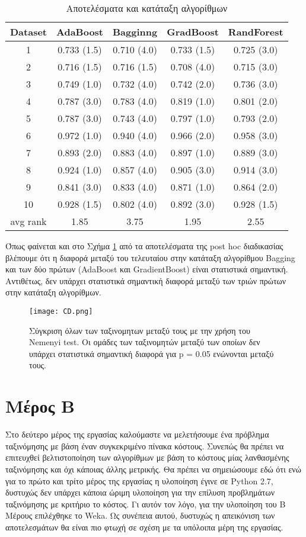 \begin{table*}
	\centering
	\caption{Αποτελέσματα και κατάταξη αλγορίθμων}
	\label{tab:ranking}
	\begin{tabular}{ccccc}
		\hline
		\ttfamily Dataset & \ttfamily AdaBoost & \ttfamily Bagginng & \ttfamily GradBoost & \ttfamily RandForest
		\\	\hline
		1&	0.733 (1.5)&    0.710 (4.0) &	0.733 (1.5)&	0.725 (3.0) \\ \hline
		2&	0.716 (1.5)&    0.716 (1.5) &	0.708 (4.0)&	0.715 (3.0)\\ \hline
		3&	0.749 (1.0)&	0.732 (4.0)&	0.742 (2.0)&	0.736 (3.0) \\ \hline
		4&	0.787 (3.0)&	0.783 (4.0)&	0.819 (1.0)&	0.801 (2.0)\\ \hline
		5&	0.787 (3.0)&	0.743 (4.0)&	0.797 (1.0)&	0.793 (2.0)\\ \hline
		6&	0.972 (1.0)&	0.940 (4.0)&	0.966 (2.0)&	0.958 (3.0)\\ \hline
		7&	0.893 (2.0)&	0.883 (4.0)&	0.897 (1.0)&	0.889 (3.0)\\ \hline
		8&	0.924 (1.0)&	0.857 (4.0)&	0.905 (3.0)&	0.914 (3.0)\\ \hline
		9&	0.841 (3.0)&	0.833 (4.0)&	0.871 (1.0)&	0.864 (2.0)\\ \hline
		10&	0.928 (1.5)&	0.802 (4.0)&	0.892 (3.0)&	0.928 (1.5)\\ \hline
		avg rank&1.85 &	3.75 & 1.95 & 2.55
		\\ \hline
	\end{tabular}
\end{table*}

Όπως φαίνεται και στο Σχήμα \ref{fig:CD} από τα αποτελέσματα της post hoc διαδικασίας βλέπουμε ότι η διαφορά μεταξύ του τελευταίου στην κατάταξη αλγορίθμου Bagging και των δύο πρώτων (AdaBoost και GradientBoost) είναι στατιστικά σημαντική. Αντιθέτως, δεν υπάρχει στατιστικά σημαντική διαφορά μεταξύ των τριών πρώτων στην κατάταξη αλγορίθμων.

\begin{figure}
	\centering
	\texttt{[image: CD.png]} %
	\caption{Σύγκριση όλων των ταξινομητων μεταξύ τους με την χρήση του Nemenyi test. Οι ομάδες των ταξινομητών μεταξύ των οποίων δεν υπάρχει στατιστικά σημαντική διαφορά για p = 0.05 ενώνονται μεταξύ τους.}
	\label{fig:CD}
\end{figure}


\section{Μέρος Β}
Στο δεύτερο μέρος της εργασίας καλούμαστε να μελετήσουμε ένα πρόβλημα ταξινόμησης με βάση έναν συγκεκριμένο πίνακα κόστους. Συνεπώς θα πρέπει να επιτευχθεί βελτιστοποίηση των αλγορίθμων με βάση το κόστους μίας λανθασμένης ταξινόμησης και όχι κάποιας άλλης μετρικής. Θα πρέπει να σημειώσουμε εδώ ότι ενώ για το πρώτο και τρίτο μέρος της εργασίας η υλοποίηση έγινε σε Python 2.7,  δυστυχώς δεν υπάρχει κάποια ώριμη υλοποίηση για την επίλυση προβλημάτων ταξινόμησης με κριτήριο το κόστος. Γι αυτόν τον λόγο, για την υλοποίηση του Β Μέρους επιλέχθηκε το Weka. Ως συνέπεια αυτού, δυστυχώς η απεικόνιση των αποτελεσμάτων θα είναι πιο φτωχή σε σχέση με τα υπόλοιπα μέρη της εργασίας.


